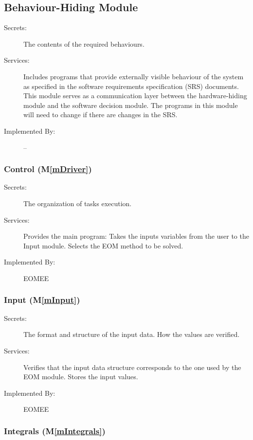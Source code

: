 \documentclass[12pt, titlepage]{article}
\newcommand{\mref}[1]{M\ref{#1}}
\begin{document}
\subsection{Behaviour-Hiding Module}

\begin{description}
\item[Secrets:]The contents of the required behaviours.
\item[Services:]Includes programs that provide externally visible behaviour of
  the system as specified in the software requirements specification (SRS)
  documents. This module serves as a communication layer between the
  hardware-hiding module and the software decision module. The programs in this
  module will need to change if there are changes in the SRS.
\item[Implemented By:] --
\end{description}

\subsubsection{Control (\mref{mDriver})}

\begin{description}
	\item[Secrets:]The organization of tasks execution.
	\item[Services:] Provides the main program: Takes the inputs variables from 
	the user to the Input module. Selects the EOM method to be solved.
	\item[Implemented By:] EOMEE
\end{description}

\subsubsection{Input (\mref{mInput})}

\begin{description}
\item[Secrets:]The format and structure of the input data. How the values are 
verified.
\item[Services:]Verifies that the input data structure corresponds to the one 
used by the EOM module. Stores the input values.
\item[Implemented By:] EOMEE
\end{description}

\subsubsection{Integrals (\mref{mIntegrals})}
\end{document}
